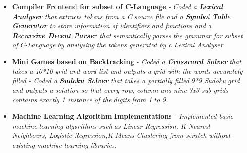 \documentclass{article}
\begin{document}
\begin{itemize}
    \item{\textbf{\large{Compiler Frontend for subset of C-Language}}}
          \newline
          \textit{- Coded a \textbf{Lexical Analyser} that extracts tokens from a C source file and a \textbf{Symbol Table Generator} to store information of identifiers and functions and a \textbf{Recursive Decent Parser} that semantically parses the grammar for subset of C-Language by analysing the tokens generated by a Lexical Analyser}
    \item{\textbf{\large{Mini Games based on Backtracking}}}
          \newline
          \textit{- Coded a \textbf{Crossword Solver} that takes a 10*10 grid and word list and outputs a grid with the words accurately filled}
          \newline
          \textit{- Coded a \textbf{Sudoku Solver} that takes a partially filled 9*9 Sudoku grid and outputs a solution so that every row, column and nine 3x3 sub-grids contains exactly 1 instance of the digits from 1 to 9.}
    \item{\textbf{\large{Machine Learning Algorithm Implementations}}}
          \newline
          \textit{- Implemented basic machine learning algorithms such as Linear Regression, K-Nearest Neighbours, Logistic Regression,K-Means Clustering from scratch without existing machine learning libraries. %
          }
\end{itemize}
\end{document}
